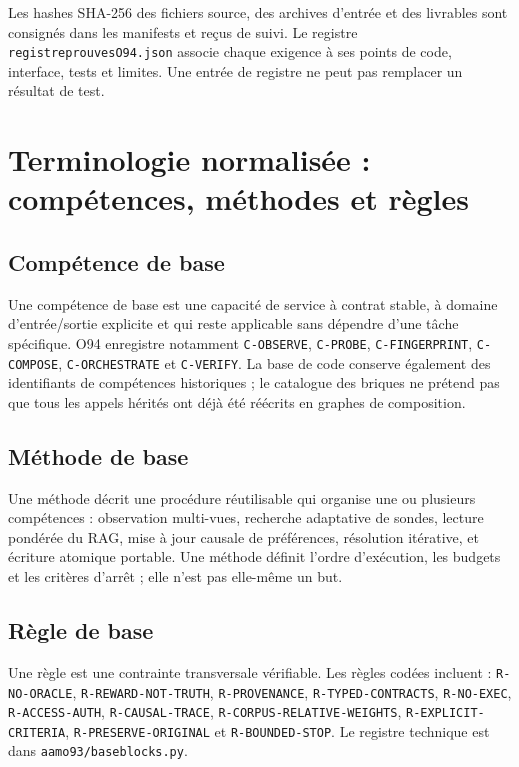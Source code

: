 \documentclass[11pt,a4paper]{article}
\begin{document}
Les hashes SHA-256 des fichiers source, des archives d'entrée et des livrables sont consignés dans les manifests et reçus de suivi. Le registre \texttt{registre\textunderscore prouves\textunderscore O94.json} associe chaque exigence à ses points de code, interface, tests et limites. Une entrée de registre ne peut pas remplacer un résultat de test.

\section{Terminologie normalisée : compétences, méthodes et règles}
\subsection{Compétence de base}
Une compétence de base est une capacité de service à contrat stable, à domaine d'entrée/sortie explicite et qui reste applicable sans dépendre d'une tâche spécifique. O94 enregistre notamment \texttt{C-OBSERVE}, \texttt{C-PROBE}, \texttt{C-FINGERPRINT}, \texttt{C-COMPOSE}, \texttt{C-ORCHESTRATE} et \texttt{C-VERIFY}. La base de code conserve également des identifiants de compétences historiques ; le catalogue des briques ne prétend pas que tous les appels hérités ont déjà été réécrits en graphes de composition.

\subsection{Méthode de base}
Une méthode décrit une procédure réutilisable qui organise une ou plusieurs compétences : observation multi-vues, recherche adaptative de sondes, lecture pondérée du RAG, mise à jour causale de préférences, résolution itérative, et écriture atomique portable. Une méthode définit l'ordre d'exécution, les budgets et les critères d'arrêt ; elle n'est pas elle-même un but.

\subsection{Règle de base}
Une règle est une contrainte transversale vérifiable. Les règles codées incluent : \texttt{R-NO-ORACLE}, \texttt{R-REWARD-NOT-TRUTH}, \texttt{R-PROVENANCE}, \texttt{R-TYPED-CONTRACTS}, \texttt{R-NO-EXEC}, \texttt{R-ACCESS-AUTH}, \texttt{R-CAUSAL-TRACE}, \texttt{R-CORPUS-RELATIVE-WEIGHTS}, \texttt{R-EXPLICIT-CRITERIA}, \texttt{R-PRESERVE-ORIGINAL} et \texttt{R-BOUNDED-STOP}. Le registre technique est dans \texttt{aam\textunderscore o93/base\textunderscore blocks.py}.
\end{document}
